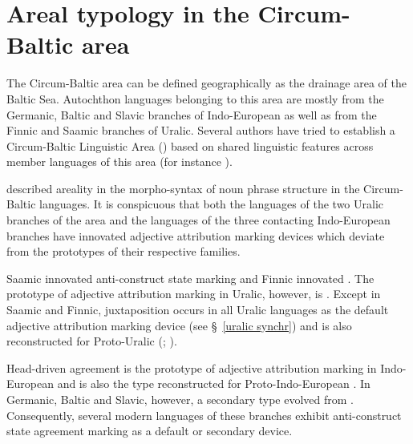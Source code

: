
\chapter{Areal typology in the Circum-Baltic area}\label{circumbaltic}
The Circum-Baltic area can be defined geographically as the drainage area of the Baltic Sea. Autochthon languages belonging to this area are mostly from the Germanic, Baltic and Slavic branches of Indo-European as well as from the Finnic and Saamic branches of Uralic. Several authors have tried to establish a Circum-Baltic Linguistic Area () based on shared linguistic features across member languages of this area (for instance \citealt{koptjevskaja-tamm2006}).

\cite{riesler2006a} described areality in the morpho-syntax of noun phrase structure in the Circum-Baltic languages. It is conspicuous that both the languages of the two Uralic branches of the area and the languages of the three contacting Indo-European branches have innovated adjective attribution marking devices which deviate from the prototypes of their respective families.

Saamic innovated anti\hyp{}construct state marking and Finnic innovated . The prototype of adjective attribution marking in Uralic, however, is . Except in Saamic and Finnic, juxtaposition occurs in all Uralic languages as the default adjective attribution marking device (see \S~\ref{uralic synchr}) and is also reconstructed for Proto\hyp{}Uralic (\citealt[66, 81]{decsy1990}; \citealt[32]{janhunen1981}).

Head\hyp{}driven agreement is the prototype of adjective attribution marking in Indo-European and is also the type reconstructed for Proto\hyp{}Indo-European \citep{decsy1991,watkins1998}. In Germanic, Baltic and Slavic, however, a secondary type evolved from . Consequently, several modern languages of these branches exhibit anti\hyp{}construct state agreement marking as a default or secondary device.

